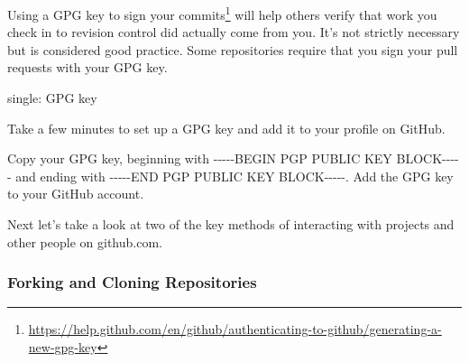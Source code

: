 Using a GPG key to sign your commits\footnote{\url{https://help.github.com/en/github/authenticating-to-github/generating-a-new-gpg-key}}
will help others verify that work you check in to revision control did
actually come from you. It's not strictly necessary but is considered
good practice. Some repositories require that you sign your pull
requests with your GPG key.

single: GPG key

Take a few minutes to set up a GPG key and add it to your profile on
GitHub.

\begin{Shaded}
\begin{Highlighting}[]
\OperatorTok{<}\OperatorTok{>}

\KeywordTok{|} \KeywordTok{|} \KeywordTok{|} 
\end{Highlighting}
\end{Shaded}

Copy your GPG key, beginning with
-\/-\/-\/-\/-BEGIN PGP PUBLIC KEY BLOCK-\/-\/-\/-\/- and ending with
-\/-\/-\/-\/-END PGP PUBLIC KEY BLOCK-\/-\/-\/-\/-. Add the GPG key to
your GitHub account.

Next let's take a look at two of the key methods of interacting with
projects and other people on github.com.

\hypertarget{forking-and-cloning-repositories}{%
\subsubsection{Forking and Cloning
Repositories}\label{forking-and-cloning-repositories}}

